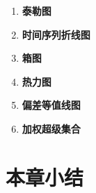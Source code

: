 









\begin{enumerate}[(1)]
\item \textbf{泰勒图}

\item \textbf{时间序列折线图}

\item \textbf{箱图}

\item \textbf{热力图}

\item \textbf{偏差等值线图}

\item \textbf{加权超级集合}

\end{enumerate}

\section{本章小结}


